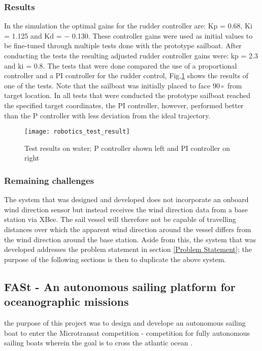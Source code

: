 \subsubsection{Results}

In the simulation the optimal gains for the rudder controller are: Kp = 0.68, Ki = 1.125 and Kd = − 0.130. These controller gains were used as initial values to be fine-tuned through
multiple tests done with the prototype sailboat. After conducting the tests the resulting adjusted rudder controller gains were: kp = 2.3 and ki = 0.8. The tests that were done 
compared the use of a proportional controller and a PI controller for the rudder control, Fig.\ref{fig:robotics_test_result} shows the results of one of the tests. Note that the 
sailboat was initially placed to face $90\circ$ from target location. In all tests that were conducted the prototype sailboat reached the specified target coordinates, the PI 
controller, however, performed better than the P controller with less deviation from the ideal trajectory.

\begin{figure}[!h]
    \centering
    \texttt{[image: robotics\_test\_result]}
    \caption[Test results comparing P controller and PI controller]{Test results on water; P controller shown left and PI controller on right \cite{robotics5010005}}
    \label{fig:robotics_test_result}
\end{figure}

\subsubsection{Remaining challenges}

The system that was designed and developed does not incorporate an onboard wind direction sensor but instead receives the wind direction data from a base station via XBee. 
The sail vessel will therefore not be capable of travelling distances over which the apparent wind direction around the vessel differs from the wind direction around the base 
station. Aside from this, the system that was developed addresses the problem statement in section \ref{Problem Statement}; the purpose of the following sections is then to duplicate the 
above system.


\subsection{FASt - An autonomous sailing platform for oceanographic missions}
the purpose of this project was to design and develope an autonomous sailing boat to enter the Microtransat competition - competition for fully autonomous sailing boats wherein the goal 
is to cross the atlantic ocean \cite{Alves2008FAStA}.


